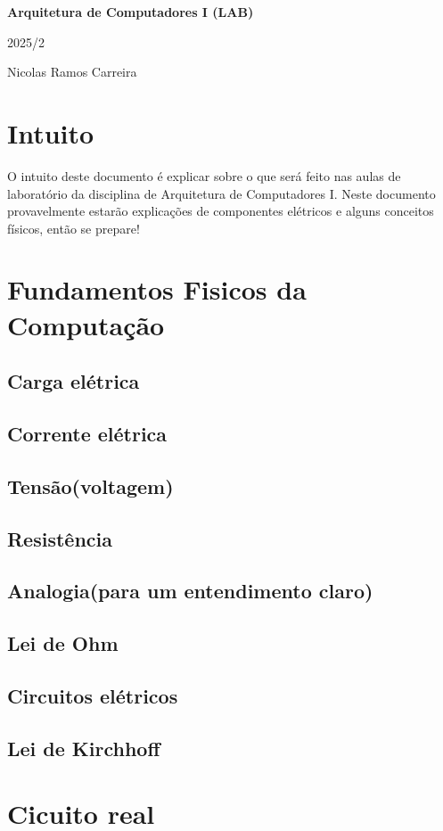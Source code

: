 \documentclass{report}
\begin{document}
	
	\begin{titlepage}
	\centering
	\vspace*{5cm} %
	
	{\Huge\bfseries Arquitetura de Computadores I (LAB)\par} %
	
	\vspace{0.5cm}
	{\Large 2025/2\par} %
	
	\vfill
	{\large Nicolas Ramos Carreira\par} %
	
	\vspace*{2cm}
	\end{titlepage}
	
	\tableofcontents
	\newpage
	
	\chapter{Intuito}
	O intuito deste documento é explicar sobre o que será feito nas aulas de laboratório da disciplina de Arquitetura de Computadores I. Neste documento provavelmente estarão explicações de componentes elétricos e alguns conceitos físicos, então se prepare!
	\chapter{Fundamentos Fisicos da Computação}
	\section{Carga elétrica}
	\section{Corrente elétrica}
	\section{Tensão(voltagem)}
	\section{Resistência}
	\section{Analogia(para um entendimento claro)}
	\section{Lei de Ohm}
	\section{Circuitos elétricos}
	\section{Lei de Kirchhoff}
	
	\chapter{Cicuito real}
\end{document}

